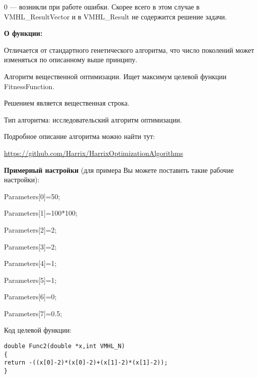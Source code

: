 \documentclass[a4paper,12pt]{article}
\begin{document}
 0 --- возникли при работе ошибки. Скорее всего в этом случае в VMHL\_ResultVector и в VMHL\_Result не содержится решение задачи.

\textbf{О функции:}

Отличается от стандартного генетического алгоритма, что число поколений может изменяться по описанному выше принципу.

Алгоритм вещественной оптимизации. Ищет максимум целевой функции FitnessFunction.

Решением является вещественная строка.

Тип алгоритма: исследовательский алгоритм оптимизации.

Подробное описание алгоритма можно найти тут:

\href{https://github.com/Harrix/HarrixOptimizationAlgorithms/blob/master/\_HarrixOptimizationAlgorithms.pdf}{https://github.com/Harrix/HarrixOptimizationAlgorithms}

\textbf{Примерный настройки} (для примера Вы можете поставить такие рабочие настройки):

 Parameters[0]=50;
 
Parameters[1]=100*100;

Parameters[2]=2;

Parameters[3]=2;

Parameters[4]=1;

Parameters[5]=1;

Parameters[6]=0;

Parameters[7]=0.5;

Код целевой функции:
\begin{lstlisting}[caption=Оптимизируемая функция]
double Func2(double *x,int VMHL_N)
{
return -((x[0]-2)*(x[0]-2)+(x[1]-2)*(x[1]-2));
}
\end{lstlisting}
\end{document}

